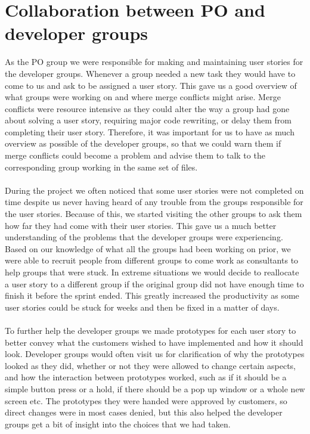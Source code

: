 \section{Collaboration between PO and developer groups}
As the PO group we were responsible for making and maintaining user stories for the developer groups.
Whenever a group needed a new task they would have to come to us and ask to be assigned a user story.
This gave us a good overview of what groups were working on and where merge conflicts might arise.
Merge conflicts were resource intensive as they could alter the way a group had gone about solving a user story, requiring major code rewriting, or delay them from completing their user story.
Therefore, it was important for us to have as much overview as possible of the developer groups, so that we could warn them if merge conflicts could become a problem and advise them to talk to the corresponding group working in the same set of files.
\\
\\
During the project we often noticed that some user stories were not completed on time despite us never having heard of any trouble from the groups responsible for the user stories.
Because of this, we started visiting the other groups to ask them how far they had come with their user stories.
This gave us a much better understanding of the problems that the developer groups were experiencing. 
Based on our knowledge of what all the groups had been working on prior, we were able to recruit people from different groups to come work as consultants to help groups that were stuck.
In extreme situations we would decide to reallocate a user story to a different group if the original group did not have enough time to finish it before the sprint ended.
This greatly increased the productivity as some user stories could be stuck for weeks and then be fixed in a matter of days.
\\
\\
To further help the developer groups we made prototypes for each user story to better convey what the customers wished to have implemented and how it should look.
Developer groups would often visit us for clarification of why the prototypes looked as they did, whether or not they were allowed to change certain aspects, and how the interaction between prototypes worked, such as if it should be a simple button press or a hold, if there should be a pop up window or a whole new screen etc.
The prototypes they were handed were approved by customers, so direct changes were in most cases denied, but this also helped the developer groups get a bit of insight into the choices that we had taken.
